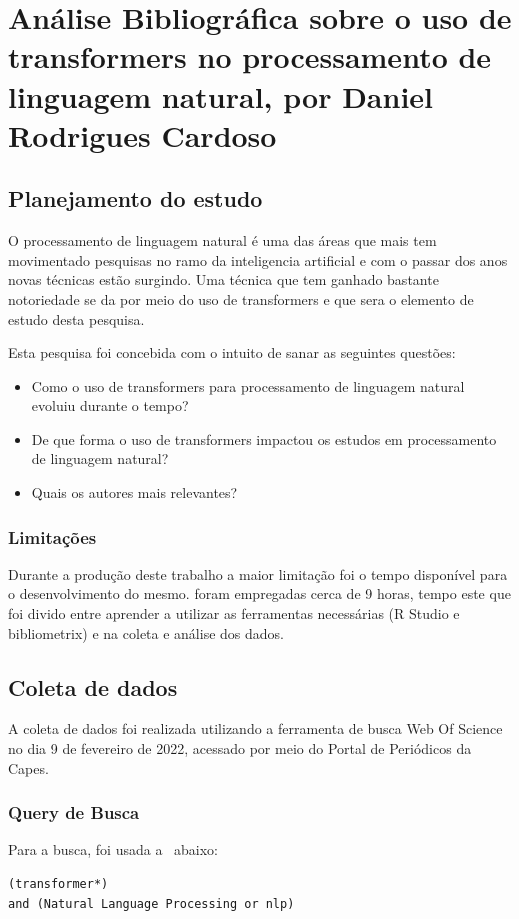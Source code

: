 \chapter{Análise Bibliográfica sobre o uso de transformers no processamento de linguagem natural, por Daniel Rodrigues Cardoso}

\section{Planejamento do estudo}
O processamento de linguagem natural é uma das áreas que mais tem movimentado pesquisas no ramo da inteligencia artificial e com o passar dos anos novas técnicas estão surgindo. Uma técnica que tem ganhado bastante notoriedade se da por meio do uso de transformers e que sera o elemento de estudo desta pesquisa.

Esta pesquisa foi concebida com o intuito de sanar as seguintes questões:
\begin{itemize}
    \item Como o uso de transformers para processamento de linguagem natural evoluiu durante o tempo?
    
    \item De que forma o uso de transformers impactou os estudos em processamento de linguagem natural?
    
    \item Quais os autores mais relevantes?
\end{itemize}



\subsection{Limitações}Durante a produção deste trabalho a maior limitação foi o tempo disponível para o desenvolvimento do mesmo. foram empregadas cerca de 9 horas, tempo este que foi divido entre aprender a utilizar as ferramentas necessárias (R Studio e bibliometrix) e na coleta e análise dos dados.

\section{Coleta de dados}
A coleta de dados foi realizada utilizando a ferramenta de busca Web Of Science no dia 9 de fevereiro de 2022, acessado por meio do Portal de Periódicos da Capes.

\subsection{Query de Busca}
Para a busca, foi usada a \query\ abaixo:
\begin{verbatim}
(transformer*) 
and (Natural Language Processing or nlp)
\end{verbatim}
